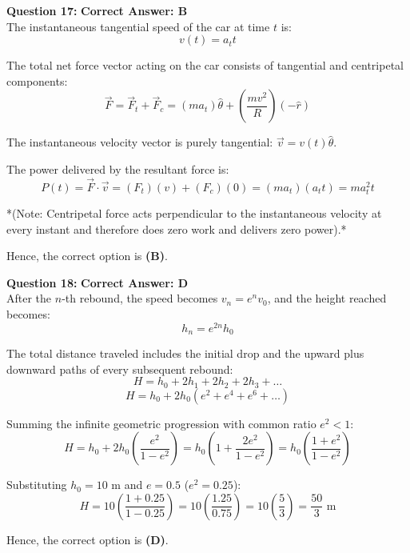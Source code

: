 \documentclass[11pt,a4paper]{article}
\begin{document}
\begin{tcolorbox}[solbox]
\textbf{\textcolor{primaryDark}{Question 17:}} \hfill \textbf{\textcolor{l1Green}{Correct Answer: B}}\\
\vspace{4pt}
The instantaneous tangential speed of the car at time $t$ is:
$$v(t) = a_t t$$

The total net force vector acting on the car consists of tangential and centripetal components:
$$\vec{F} = \vec{F}_t + \vec{F}_c = (m a_t)\hat{\theta} + \left(\frac{m v^2}{R}\right)(-\hat{r})$$

The instantaneous velocity vector is purely tangential: $\vec{v} = v(t)\hat{\theta}$.

The power delivered by the resultant force is:
$$P(t) = \vec{F} \cdot \vec{v} = (F_t)(v) + (F_c)(0) = (m a_t)(a_t t) = m a_t^2 t$$

*(Note: Centripetal force acts perpendicular to the instantaneous velocity at every instant and therefore does zero work and delivers zero power).*

Hence, the correct option is \textbf{(B)}.
\end{tcolorbox}

\begin{tcolorbox}[solbox]
\textbf{\textcolor{primaryDark}{Question 18:}} \hfill \textbf{\textcolor{l1Green}{Correct Answer: D}}\\
\vspace{4pt}
After the $n$-th rebound, the speed becomes $v_n = e^n v_0$, and the height reached becomes:
$$h_n = e^{2n} h_0$$

The total distance traveled includes the initial drop and the upward plus downward paths of every subsequent rebound:
$$H = h_0 + 2h_1 + 2h_2 + 2h_3 + \dots$$
$$H = h_0 + 2h_0\left(e^2 + e^4 + e^6 + \dots\right)$$

Summing the infinite geometric progression with common ratio $e^2 < 1$:
$$H = h_0 + 2h_0\left(\frac{e^2}{1 - e^2}\right) = h_0\left(1 + \frac{2e^2}{1 - e^2}\right) = h_0\left(\frac{1 + e^2}{1 - e^2}\right)$$

Substituting $h_0 = 10\text{ m}$ and $e = 0.5$ ($e^2 = 0.25$):
$$H = 10\left(\frac{1 + 0.25}{1 - 0.25}\right) = 10\left(\frac{1.25}{0.75}\right) = 10\left(\frac{5}{3}\right) = \frac{50}{3}\text{ m}$$

Hence, the correct option is \textbf{(D)}.
\end{tcolorbox}
\end{document}
